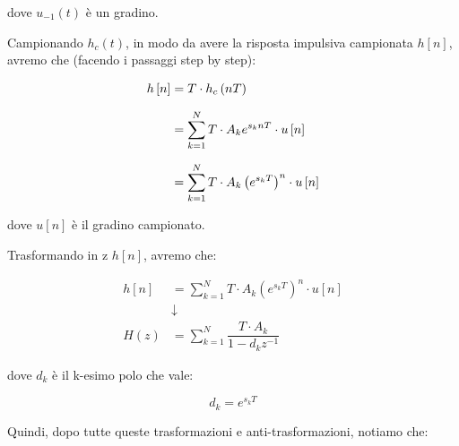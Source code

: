 dove $u_{-1} \left(t\right)$ è un gradino. \newline 

Campionando $h_c \left(t\right)$, in modo da avere la risposta impulsiva campionata $h \left[   n\right]$, 
avremo che (facendo i passaggi step by step): 

{
    \Large 
    \begin{equation}
        \setlength{\jot}{10pt} %
        \begin{split}
            h \left[ n\right]
            &= 
            T \cdot h_c \left(n T\right)
            \\
            &= 
            \sum_{k = 1}^{N}
            T \cdot A_k e^{s_k nT} \cdot u \left[ n\right]
            \\
            &= 
            \sum_{k = 1}^{N}
            T \cdot A_k \left(e^{s_k T}\right)^{n} \cdot u \left[ n\right]
        \end{split}
    \end{equation}
}

dove $u \left[ n\right]$ è il gradino campionato. \newline 

\newpage 

Trasformando in z $h \left[ n\right]$, avremo che: 

{
    \Large 
    \begin{equation}
        \begin{split}
            h \left[ n\right]
            &= 
            \sum_{k = 1}^{N}
            T \cdot A_k \left(e^{s_k T}\right)^{n} \cdot u \left[ n\right]
            \\
            &\downarrow
            \\
            H \left(z\right)
            &= 
            \sum_{k = 1}^{N}
            \dfrac{T \cdot A_k}{1 - d_k z^{-1}}
        \end{split}
    \end{equation}
}

dove $d_k$ è il k-esimo polo che vale: 

{
    \Large 
    \begin{equation}
        d_k = e^{s_k T}
    \end{equation}
}

Quindi, dopo tutte queste trasformazioni e anti-trasformazioni, notiamo che: 

